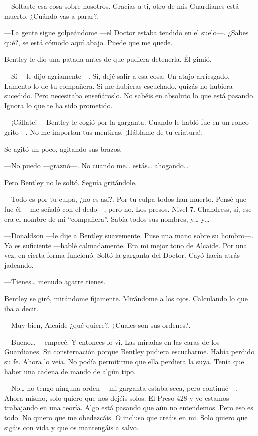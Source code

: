 ---Soltaste esa cosa sobre nosotros. Gracias a ti, otro de mis
Guardianes está muerto. ¿Cuándo vas a parar?.

---La gente sigue golpeándome ---el Doctor estaba tendido en el
suelo---. ¿Sabes qué?, se está cómodo aquí abajo. Puede que me quede.

Bentley le dio una patada antes de que pudiera detenerla. Él gimió.

---Sí ---le dijo agriamente---. Sí, dejé salir a esa cosa. Un atajo
arriesgado. Lamento lo de tu compañera. Si me hubieras escuchado, quizás
no hubiera sucedido. Pero necesitaba enseñároslo. No sabéis en absoluto
lo que está pasando. Ignora lo que te ha sido prometido.

---¡Cállate! ---Bentley le cogió por la garganta. Cuando le habló fue en
un ronco grito---. No me importan tus mentiras. ¡Háblame de tu
criatura!.

Se agitó un poco, agitando sus brazos.

---No puedo ---graznó---. No cuando me\ldots{} estás\ldots{}
ahogando\ldots{}

Pero Bentley no le soltó. Seguía gritándole.

---Todo es por tu culpa, ¿no es así?. Por tu culpa todos han muerto.
Pensé que fue él ---me señaló con el dedo---, pero no. Los presos. Nivel
7. Chandress, sí, ese era el nombre de mi ``compañera''. Sabía todos sus
nombres, y\ldots{} y\ldots{}

---Donaldson ---le dije a Bentley suavemente. Puse una mano sobre su
hombro---. Ya es suficiente ---hablé calmadamente. Era mi mejor tono de
Alcaide. Por una vez, en cierta forma funcionó. Soltó la garganta del
Doctor. Cayó hacia atrás jadeando.

---Tienes\ldots{} menudo agarre tienes.

Bentley se giró, mirándome fijamente. Mirándome a los ojos. Calculando
lo que iba a decir.

---Muy bien, Alcaide ¿qué quiere?. ¿Cuales son sus ordenes?.

---Bueno\ldots{} ---empecé. Y entonces lo vi. Las miradas en las caras
de los Guardianes. Su consternación porque Bentley pudiera escucharme.
Había perdido su fe. Ahora lo veía. No podía permitirme que ella
perdiera la suya. Tenía que haber una cadena de mando de algún tipo.

---No\ldots{} no tengo ninguna orden ---mi garganta estaba seca, pero
continué---. Ahora mismo, solo quiero que nos dejéis solos. El Preso 428
y yo estamos trabajando en una teoría. Algo está pasando que aún no
entendemos. Pero eso es todo. No quiero que me obedezcáis. O incluso que
creáis en mi. Solo quiero que sigáis con vida y que os mantengáis a
salvo.

